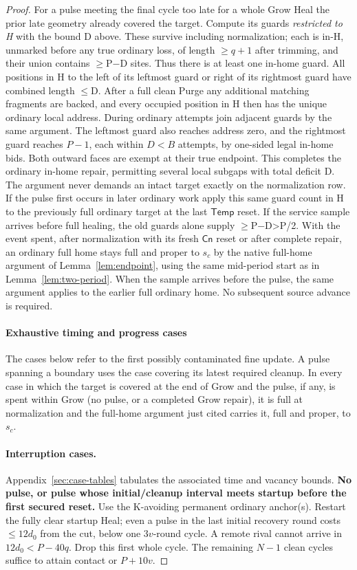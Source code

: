 \begin{proof}
For a pulse meeting the final cycle too late for a whole Grow Heal the prior late geometry already covered the target. Compute its guards \emph{restricted to H} with the bound D above. These survive including normalization; each is in-H, unmarked before any true ordinary loss, of length \(\ge\)\(q+1\) after trimming, and their union contains \(\ge\)P\(-\)D sites. Thus there is at least one in-home guard. All positions in H to the left of its leftmost guard or right of its rightmost guard have combined length \(\le\)D. After a full clean Purge any additional matching fragments are backed, and every occupied position in H then has the unique ordinary local address. During ordinary attempts join adjacent guards by the same argument. The leftmost guard also reaches address zero, and the rightmost guard reaches \(P- 1\), each within \(D<B\) attempts, by one-sided legal in-home bids. Both outward faces are exempt at their true endpoint. This completes the ordinary in-home repair, permitting several local subgaps with total deficit D. The argument never demands an intact target exactly on the normalization row. If the pulse first occurs in later ordinary work apply this same guard count in H to the previously full ordinary target at the last \(\mathsf{Temp}\) reset. If the service sample arrives before full healing, the old guards alone supply \(\ge\)P\(-\)D\textgreater{}P/2. With the event spent, after normalization with its fresh \(\mathsf{Cn}\) reset or after complete repair, an ordinary full home stays full and proper to \(s_c\) by the native full-home argument of Lemma~\ref{lem:endpoint}, using the same mid-period start as in Lemma~\ref{lem:two-period}. When the sample arrives before the pulse, the same argument applies to the earlier full ordinary home. No subsequent source advance is required.

\paragraph{Exhaustive timing and progress cases}

The cases below refer to the first possibly contaminated fine update. A pulse spanning a boundary uses the case covering its latest required cleanup. In every case in which the target is covered at the end of Grow and the pulse, if any, is spent within Grow (no pulse, or a completed Grow repair), it is full at normalization and the full-home argument just cited carries it, full and proper, to \(s_c\).

\paragraph{Interruption cases.} Appendix~\ref{sec:case-tables} tabulates the associated time and vacancy bounds.
\medskip\noindent\textbf{No pulse, or pulse whose initial/cleanup interval meets startup before the first secured reset.} Use the K-avoiding permanent ordinary anchor(s). Restart the fully clear startup Heal; even a pulse in the last initial recovery round costs \(\le\)\(12d_0\) from the cut, below one \(3v\)-round cycle. A remote rival cannot arrive in \(12d_0<P- 40q\). Drop this first whole cycle. The remaining \(N-1\) clean cycles suffice to attain contact or \(P+10v\).


\end{proof}
